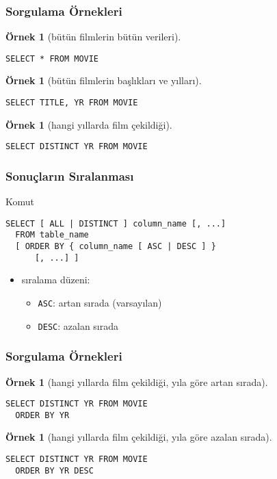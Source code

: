 \documentclass[dvipsnames]{beamer}
\theoremstyle{definition}
\theoremstyle{example}
\newtheorem{ornek}[theorem]{Örnek}
\theoremstyle{plain}
\begin{document}
\begin{frame}[fragile]
  \frametitle{Sorgulama Örnekleri}

  \begin{ornek}[bütün filmlerin bütün verileri]
    \begin{lstlisting}
SELECT * FROM MOVIE
    \end{lstlisting}
  \end{ornek}

  \pause
  \begin{ornek}[bütün filmlerin başlıkları ve yılları]
    \begin{lstlisting}
SELECT TITLE, YR FROM MOVIE
    \end{lstlisting}
  \end{ornek}

  \pause
  \begin{ornek}[hangi yıllarda film çekildiği]
    \begin{lstlisting}
SELECT DISTINCT YR FROM MOVIE
    \end{lstlisting}
  \end{ornek}
\end{frame}

\begin{frame}[fragile]
  \frametitle{Sonuçların Sıralanması}

  \begin{block}{Komut}
    \begin{lstlisting}
SELECT [ ALL | DISTINCT ] column_name [, ...]
  FROM table_name
  [ ORDER BY { column_name [ ASC | DESC ] }
      [, ...] ]
    \end{lstlisting}
  \end{block}

  \pause
  \begin{itemize}
    \item sıralama düzeni:
    \begin{itemize}
      \item \lstinline!ASC!: artan sırada (varsayılan)
      \item \lstinline!DESC!: azalan sırada
    \end{itemize}
  \end{itemize}
\end{frame}

\begin{frame}[fragile]
  \frametitle{Sorgulama Örnekleri}

  \begin{ornek}[hangi yıllarda film çekildiği, yıla göre artan sırada]
    \begin{lstlisting}
SELECT DISTINCT YR FROM MOVIE
  ORDER BY YR
    \end{lstlisting}
  \end{ornek}

  \pause
  \begin{ornek}[hangi yıllarda film çekildiği, yıla göre azalan sırada]
    \begin{lstlisting}
SELECT DISTINCT YR FROM MOVIE
  ORDER BY YR DESC
    \end{lstlisting}
  \end{ornek}
\end{frame}
\end{document}
